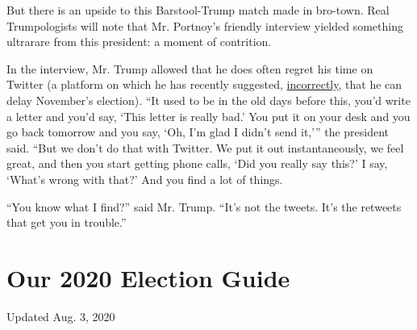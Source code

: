 But there is an upside to this Barstool-Trump match made in bro-town.
Real Trumpologists will note that Mr. Portnoy's friendly interview
yielded something ultrarare from this president: a moment of contrition.

In the interview, Mr. Trump allowed that he does often regret his time
on Twitter (a platform on which he has recently suggested,
\href{https://www.nytimes.com/2020/07/30/us/politics/trump-postpone-election.html}{incorrectly},
that he can delay November's election). ``It used to be in the old days
before this, you'd write a letter and you'd say, `This letter is really
bad.' You put it on your desk and you go back tomorrow and you say, `Oh,
I'm glad I didn't send it,''' the president said. ``But we don't do that
with Twitter. We put it out instantaneously, we feel great, and then you
start getting phone calls, `Did you really say this?' I say, `What's
wrong with that?' And you find a lot of things.

``You know what I find?'' said Mr. Trump. ``It's not the tweets. It's
the retweets that get you in trouble.''

\hypertarget{our-2020-election-guide}{%
\section{Our 2020 Election Guide}\label{our-2020-election-guide}}

Updated Aug. 3, 2020


